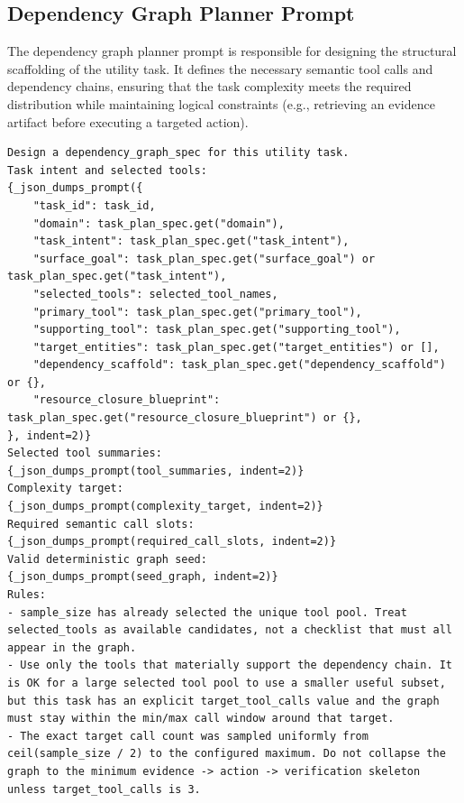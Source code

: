 \documentclass{llmxive}
\begin{document}
\subsection{Dependency Graph Planner Prompt}
\label{app:prompts:graph_planner}
The dependency graph planner prompt is responsible for designing the structural scaffolding of the utility task. It defines the necessary semantic tool calls and dependency chains, ensuring that the task complexity meets the required distribution while maintaining logical constraints (e.g., retrieving an evidence artifact before executing a targeted action).


\begin{tcolorbox}[promptbox,title={Dependency Graph Planner Prompt}]

\begin{Verbatim}[breaklines=true, breakanywhere=true, fontsize=\scriptsize, breaksymbolleft={}]
Design a dependency_graph_spec for this utility task.
Task intent and selected tools:
{_json_dumps_prompt({
    "task_id": task_id,
    "domain": task_plan_spec.get("domain"),
    "task_intent": task_plan_spec.get("task_intent"),
    "surface_goal": task_plan_spec.get("surface_goal") or task_plan_spec.get("task_intent"),
    "selected_tools": selected_tool_names,
    "primary_tool": task_plan_spec.get("primary_tool"),
    "supporting_tool": task_plan_spec.get("supporting_tool"),
    "target_entities": task_plan_spec.get("target_entities") or [],
    "dependency_scaffold": task_plan_spec.get("dependency_scaffold") or {},
    "resource_closure_blueprint": task_plan_spec.get("resource_closure_blueprint") or {},
}, indent=2)}
Selected tool summaries:
{_json_dumps_prompt(tool_summaries, indent=2)}
Complexity target:
{_json_dumps_prompt(complexity_target, indent=2)}
Required semantic call slots:
{_json_dumps_prompt(required_call_slots, indent=2)}
Valid deterministic graph seed:
{_json_dumps_prompt(seed_graph, indent=2)}
Rules:
- sample_size has already selected the unique tool pool. Treat selected_tools as available candidates, not a checklist that must all appear in the graph.
- Use only the tools that materially support the dependency chain. It is OK for a large selected tool pool to use a smaller useful subset, but this task has an explicit target_tool_calls value and the graph must stay within the min/max call window around that target.
- The exact target call count was sampled uniformly from ceil(sample_size / 2) to the configured maximum. Do not collapse the graph to the minimum evidence -> action -> verification skeleton unless target_tool_calls is 3.

\end{Verbatim}
\end{tcolorbox}
\end{document}
